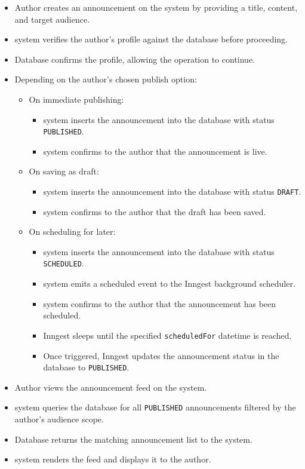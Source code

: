 \begin{itemize}
    \item Author creates an announcement on the system by providing a title, content, and target audience.
    \item system verifies the author's profile against the database before proceeding.
    \item Database confirms the profile, allowing the operation to continue.

    \item Depending on the author's chosen publish option:
    \begin{itemize}
        \item On immediate publishing:
        \begin{itemize}
            \item system inserts the announcement into the database with status \texttt{PUBLISHED}.
            \item system confirms to the author that the announcement is live.
        \end{itemize}
        \item On saving as draft:
        \begin{itemize}
            \item system inserts the announcement into the database with status \texttt{DRAFT}.
            \item system confirms to the author that the draft has been saved.
        \end{itemize}
        \item On scheduling for later:
        \begin{itemize}
            \item system inserts the announcement into the database with status \texttt{SCHEDULED}.
            \item system emits a scheduled event to the Inngest background scheduler.
            \item system confirms to the author that the announcement has been scheduled.
            \item Inngest sleeps until the specified \texttt{scheduledFor} datetime is reached.
            \item Once triggered, Inngest updates the announcement status in the database to \texttt{PUBLISHED}.
        \end{itemize}
    \end{itemize}

    \item Author views the announcement feed on the system.
    \item system queries the database for all \texttt{PUBLISHED} announcements filtered by the author's audience scope.
    \item Database returns the matching announcement list to the system.
    \item system renders the feed and displays it to the author.
\end{itemize}

